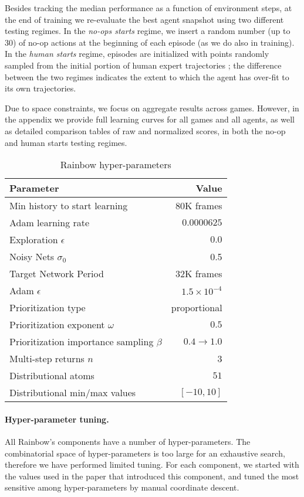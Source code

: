 \documentclass[letterpaper]{article} %
\begin{document}
Besides tracking the median performance as a function of environment steps, at the end of training we re-evaluate the best agent snapshot using two different testing regimes. In the \textit{no-ops starts} regime, we insert a random number (up to 30) of no-op actions at the beginning of each episode (as we do also in training). In the \textit{human starts} regime, episodes are initialized with points randomly sampled from  the initial portion of human expert trajectories \cite{Nair2015}; the difference between the two regimes indicates the extent to which the agent has over-fit to its own trajectories. 

Due to space constraints, we focus on aggregate results across games. However, in the appendix we provide full learning curves for all games and all agents, as well as detailed comparison tables of raw and normalized scores, in both the no-op and human starts testing regimes.

\begin{table}[b]
\centering
\vspace{-0.8em}
\small{
\begin{tabular}{ l | r}
 Parameter        & Value \\ 
\hline
 Min history to start learning  & 80K frames \\
 Adam learning rate       & $0.0000625$ \\ 
 Exploration $\epsilon$   & $0.0$ \\
 Noisy Nets $\sigma_0$ & 0.5 \\
 Target Network Period  &  32K frames \\
 Adam $\epsilon$ & $1.5\times10^{-4}$  \\
 Prioritization type & proportional \\
 Prioritization exponent $\omega$ & $0.5$ \\
 Prioritization importance sampling $\beta$ & $0.4 \rightarrow 1.0$  \\
 Multi-step returns $n$ & 3 \\
 Distributional atoms & $51$ \\
 Distributional min/max values & $[-10, 10]$ \\
\end{tabular}}
\vspace{-0.3em}
\caption{Rainbow hyper-parameters}
\label{table-hyper}
\end{table}


\paragraph{Hyper-parameter tuning.}
All Rainbow's components have a number of hyper-parameters. The combinatorial space of hyper-parameters is too large for an exhaustive search, therefore we have performed limited tuning. For each component, we started with the values used in the paper that introduced this component, and tuned the most sensitive among hyper-parameters by manual coordinate descent.
\end{document}
